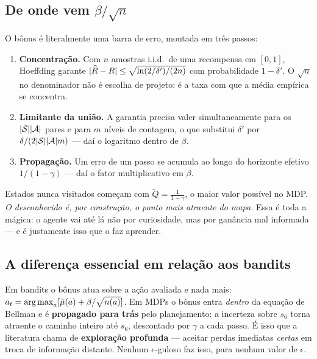 \documentclass[11pt, a4paper]{article}
\newcommand{\Qtil}{\widetilde{Q}}
\newcommand{\Rhat}{\widehat{\rec}}
\begin{document}
\subsection{De onde vem \texorpdfstring{$\beta/\sqrt{n}$}{beta/raiz(n)}}

O bônus é literalmente uma barra de erro, montada em três passos:

\begin{enumerate}
  \item \textbf{Concentração.} Com $n$ amostras i.i.d.\ de uma recompensa em $[0,1]$,
        Hoeffding garante $\abs{\Rhat - \rec} \le \sqrt{\ln(2/\delta')/(2n)}$ com
        probabilidade $1-\delta'$. O $\sqrt{n}$ no denominador não é escolha de projeto:
        é a taxa com que a média empírica se concentra.
  \item \textbf{Limitante da união.} A garantia precisa valer simultaneamente para os
        $\lvert\mathcal{S}\rvert\lvert\mathcal{A}\rvert$ pares e para $m$ níveis de contagem, o que substitui
        $\delta'$ por $\delta/(2\lvert\mathcal{S}\rvert\lvert\mathcal{A}\rvert m)$ --- daí o logaritmo dentro de $\beta$.
  \item \textbf{Propagação.} Um erro de um passo se acumula ao longo do horizonte efetivo
        $1/(1-\gamma)$ --- daí o fator multiplicativo em $\beta$.
\end{enumerate}

\begin{ideiabox}
Estados nunca visitados começam com $\Qtil = \tfrac{1}{1-\gamma}$, o maior valor possível
no MDP. \emph{O desconhecido é, por construção, o ponto mais atraente do mapa.} Essa é
toda a mágica: o agente vai até lá não por curiosidade, mas por ganância mal informada ---
e é justamente isso que o faz aprender.
\end{ideiabox}

\subsection{A diferença essencial em relação aos bandits}

Em bandits o bônus atua sobre a ação avaliada e nada mais:
$a_t = \operatorname*{arg\,max}_a[\hat\mu(a) + \beta/\sqrt{n(a)}]$. Em MDPs o bônus entra \emph{dentro} da
equação de Bellman e é \textbf{propagado para trás} pelo planejamento: a incerteza sobre
$s_6$ torna atraente o caminho inteiro até $s_6$, descontado por $\gamma$ a cada passo.
É isso que a literatura chama de \textbf{exploração profunda} --- aceitar perdas imediatas
\emph{certas} em troca de informação distante. Nenhum $\epsilon$-guloso faz isso, para
nenhum valor de $\epsilon$.
\end{document}
